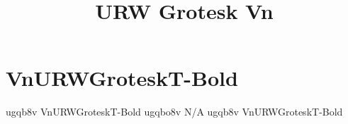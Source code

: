 \documentclass[sample]{vnsample}
\title{URW Grotesk Vn}
\begin{document}
\section{VnURWGroteskT-Bold}
    {ugqb8v}   {VnURWGroteskT-Bold}
   {ugqbo8v}  {N/A}
    {ugqb8v}   {VnURWGroteskT-Bold}
\end{document}
